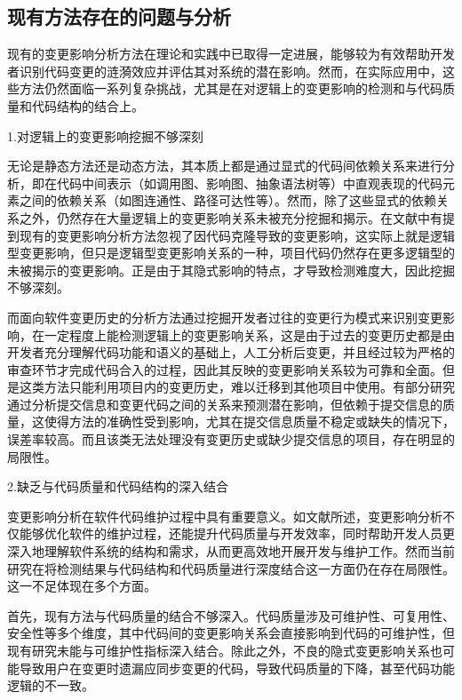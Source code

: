\subsection{现有方法存在的问题与分析}

现有的变更影响分析方法在理论和实践中已取得一定进展，能够较为有效帮助开发者识别代码变更的涟漪效应并评估其对系统的潜在影响。然而，在实际应用中，这些方法仍然面临一系列复杂挑战，尤其是在对逻辑上的变更影响的检测和与代码质量和代码结构的结合上。

1.对逻辑上的变更影响挖掘不够深刻

无论是静态方法还是动态方法，其本质上都是通过显式的代码间依赖关系来进行分析，即在代码中间表示（如调用图、影响图、抽象语法树等）中直观表现的代码元素之间的依赖关系（如图连通性、路径可达性等）。然而，除了这些显式的依赖关系之外，仍然存在大量逻辑上的变更影响关系未被充分挖掘和揭示。在文献\cite{daipeng2024software}中有提到现有的变更影响分析方法忽视了因代码克隆导致的变更影响，这实际上就是逻辑型变更影响，但只是逻辑型变更影响关系的一种，项目代码仍然存在更多逻辑型的未被揭示的变更影响。正是由于其隐式影响的特点，才导致检测难度大，因此挖掘不够深刻。

而面向软件变更历史的分析方法通过挖掘开发者过往的变更行为模式来识别变更影响，在一定程度上能检测逻辑上的变更影响关系，这是由于过去的变更历史都是由开发者充分理解代码功能和语义的基础上，人工分析后变更，并且经过较为严格的审查环节才完成代码合入的过程，因此其反映的变更影响关系较为可靠和全面。但是这类方法只能利用项目内的变更历史，难以迁移到其他项目中使用。有部分研究通过分析提交信息和变更代码之间的关系来预测潜在影响，但依赖于提交信息的质量，这使得方法的准确性受到影响，尤其在提交信息质量不稳定或缺失的情况下，误差率较高。而且该类无法处理没有变更历史或缺少提交信息的项目，存在明显的局限性。


2.缺乏与代码质量和代码结构的深入结合

变更影响分析在软件代码维护过程中具有重要意义。如文献\cite{KRETSOU2021110892}所述，变更影响分析不仅能够优化软件的维护过程，还能提升代码质量与开发效率，同时帮助开发人员更深入地理解软件系统的结构和需求，从而更高效地开展开发与维护工作。然而当前研究在将检测结果与代码结构和代码质量进行深度结合这一方面仍在存在局限性。这一不足体现在多个方面。

首先，现有方法与代码质量的结合不够深入。代码质量涉及可维护性、可复用性、安全性等多个维度，其中代码间的变更影响关系会直接影响到代码的可维护性，但现有研究未能与可维护性指标深入结合。除此之外，不良的隐式变更影响关系也可能导致用户在变更时遗漏应同步变更的代码，导致代码质量的下降，甚至代码功能逻辑的不一致。

